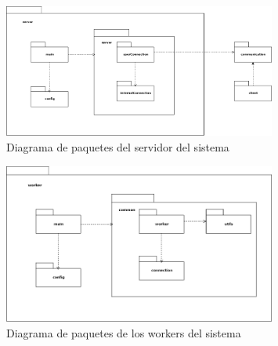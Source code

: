 \begin{figure}[H]
    \centering
    \includegraphics[width=0.8\textwidth]{imagenes/vistas/paquetes-server.png}
    \caption{Diagrama de paquetes del servidor del sistema}
    \label{fig:paquetes-server}
\end{figure}

\begin{figure}[H]
    \centering
    \includegraphics[width=0.8\textwidth]{imagenes/vistas/paquetes-workers.png}
    \caption{Diagrama de paquetes de los workers del sistema}
    \label{fig:paquetes-workers}
\end{figure}